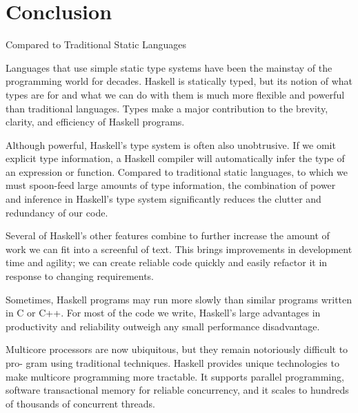 
\section{Conclusion}

%
\begin{frame}{Compared to Traditional Static Languages}

Languages that use simple static type systems have been the mainstay of the programming world for decades. Haskell is statically typed, but its notion of what types are for and what we can do with them is much more flexible and powerful than traditional languages. Types make a major contribution to the brevity, clarity, and efficiency of Haskell programs.

Although powerful, Haskell’s type system is often also unobtrusive. If we omit explicit type information, a Haskell compiler will automatically infer the type of an expression or function. Compared to traditional static languages, to which we must spoon-feed large amounts of type information, the combination of power and inference in Haskell’s type system significantly reduces the clutter and redundancy of our code.

Several of Haskell’s other features combine to further increase the amount of work we can fit into a screenful of text. This brings improvements in development time and agility; we can create reliable code quickly and easily refactor it in response to changing requirements.

Sometimes, Haskell programs may run more slowly than similar programs written in C or C++. For most of the code we write, Haskell’s large advantages in productivity and reliability outweigh any small performance disadvantage.

Multicore processors are now ubiquitous, but they remain notoriously difficult to pro- gram using traditional techniques. Haskell provides unique technologies to make multicore programming more tractable. It supports parallel programming, software transactional memory for reliable concurrency, and it scales to hundreds of thousands of concurrent threads.

\end{frame}

